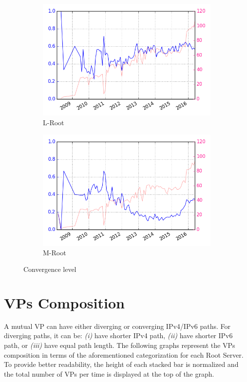 \begin{appendices}
\begin{figure}[!htb]
\begin{subfigure}{.32\textwidth}
			\includegraphics[width=\linewidth]{img/convergence_over_time_l.png}
			\caption{L-Root}
			\label{fig:convergence-l}
		\end{subfigure}											
		\begin{subfigure}{.32\textwidth}
			\centering
			\includegraphics[width=\linewidth]{img/convergence_over_time_m.png}
			\caption{M-Root}
			\label{fig:app:convergence-m}
		\end{subfigure}
		\caption{Convergence level}
		\label{fig:app:convergence}	
	\end{figure}
	

	
	\chapter{VPs Composition}
	\label{app:peer-composition}
	A mutual VP can have either diverging or converging IPv4/IPv6 paths. For diverging paths, it can be: \textit{(i)} have shorter IPv4 path, \textit{(ii)} have shorter IPv6 path, or \textit{(iii)} have equal path length. The following graphs represent the VPs composition in terms of the aforementioned categorization for each Root Server. To provide better readability, the height of each stacked bar is normalized and the total number of VPs per time is displayed at the top of the graph.
	

\end{appendices}
